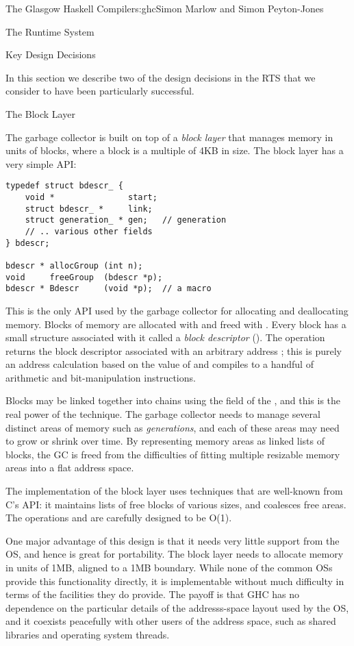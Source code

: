 \begin{aosachapter}{The Glasgow Haskell Compiler}{s:ghc}{Simon Marlow and Simon Peyton-Jones}
\begin{aosasect1}{The Runtime System}
\begin{aosasect2}{Key Design Decisions}

In this section we describe two of the design decisions in the RTS
that we consider to have been particularly successful.

\begin{aosasect3}{The Block Layer}

The garbage collector is built on top of a \emph{block layer} that
manages memory in units of blocks, where a block is a multiple of 4KB
in size.  The block layer has a very simple API:

\begin{verbatim}
typedef struct bdescr_ {
    void *               start;
    struct bdescr_ *     link;
    struct generation_ * gen;   // generation
    // .. various other fields
} bdescr;

bdescr * allocGroup (int n);
void     freeGroup  (bdescr *p);
bdescr * Bdescr     (void *p);  // a macro
\end{verbatim}

This is the only API used by the garbage collector for allocating and
deallocating memory.  Blocks of memory are allocated with
 and freed with .  Every block has a
small structure associated with it called a \emph{block descriptor}
().  The operation  returns the block
descriptor associated with an arbitrary address ; this is
purely an address calculation based on the value of  and
compiles to a handful of arithmetic and bit-manipulation instructions.

Blocks may be linked together into chains using the  field
of the , and this is the real power of the technique.
The garbage collector needs to manage several distinct areas of memory
such as \emph{generations}, and each of these areas may need to grow
or shrink over time.  By representing memory areas as linked lists of
blocks, the GC is freed from the difficulties of fitting multiple
resizable memory areas into a flat address space.

The implementation of the block layer uses techniques that are
well-known from C's  API: it maintains lists of
free blocks of various sizes, and coalesces free areas.  The
operations  and  are carefully
designed to be O(1).

One major advantage of this design is that it needs very little
support from the OS, and hence is great for portability.  The block
layer needs to allocate memory in units of 1MB, aligned to a 1MB
boundary.  While none of the common OSs provide this functionality
directly, it is implementable without much difficulty in terms of the
facilities they do provide.  The payoff is that GHC has no dependence
on the particular details of the addresss-space layout used by the OS,
and it coexists peacefully with other users of the address space, such
as shared libraries and operating system threads.


\end{aosasect3}
\end{aosasect2}
\end{aosasect1}
\end{aosachapter}
